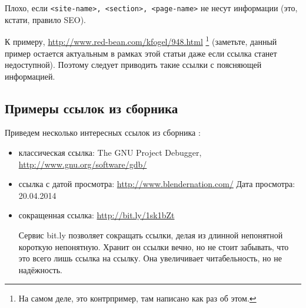 \documentclass[10pt, a5paper]{article}
\begin{document}
Плохо, если  \texttt{<site-name>, <section>, <page-name>} 
не  несут  информации  (это, кстати, правило SEO).

К  примеру, \url{http://www.red-bean.com/kfogel/948.html}  
\footnote{На самом деле, это контрпример, там написано как раз об этом.}
(заметьте, данный пример остается актуальным в рамках  этой  статьи  даже  если
ссылка  станет  недоступной).  Поэтому  следует приводить такие ссылки с
поясняющей информацией.

\subsection*{Примеры ссылок из сборника}
Приведем несколько интересных ссылок из сборника \cite{AY5}:
\begin{itemize}
\item классическая ссылка: 
The GNU Project Debugger, \url{http://www.gnu.org/software/gdb/}
\item ссылка с датой просмотра: 
\url{http://www.blendernation.com/} Дата просмотра: 20.04.2014
\item сокращенная ссылка: \url{http://bit.ly/1sk1bZt}

Сервис bit.ly позволяет сокращать ссылки, делая из длинной
непонятной короткую непонятную. Хранит он ссылки вечно, но не
стоит забывать, что это всего лишь ссылка на ссылку. Она увеличивает
читабельность, но не надёжность.
\end{itemize}
\end{document}

